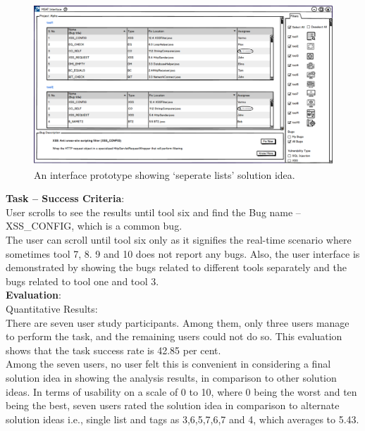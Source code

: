 \begin{figure}[hbt!]
	\centering
	\includegraphics[width=\linewidth]{figures/solution_ideas_snaps/S21_seperate_lists}
	\caption{An interface prototype showing ‘seperate lists’ solution idea.}
	\label{fig:S21_seperate_lists}
\end{figure}

\textbf{Task – Success Criteria}: \\

User scrolls to see the results until tool six and find the Bug name – XSS\_CONFIG, which is a common bug. \\

The user can scroll until tool six only as it signifies the real-time scenario where sometimes tool 7, 8. 9 and 10 does not report any bugs. Also, the user interface is demonstrated by showing the bugs related to different tools separately and the bugs related to tool one and tool 3. \\
\clearpage
\textbf{Evaluation}: \\

Quantitative Results: \\

There are seven user study participants. Among them, only three users manage to perform the task, and the remaining users could not do so. This evaluation shows that the task success rate is 42.85 per cent. \\

Among the seven users, no user felt this is convenient in considering a final solution idea in showing the analysis results, in comparison to other solution ideas. In terms of usability on a scale of 0 to 10, where 0 being the worst and ten being the best, seven users rated the solution idea in comparison to alternate solution ideas i.e., single list and tags as 3,6,5,7,6,7 and 4, which averages to 5.43. \\

